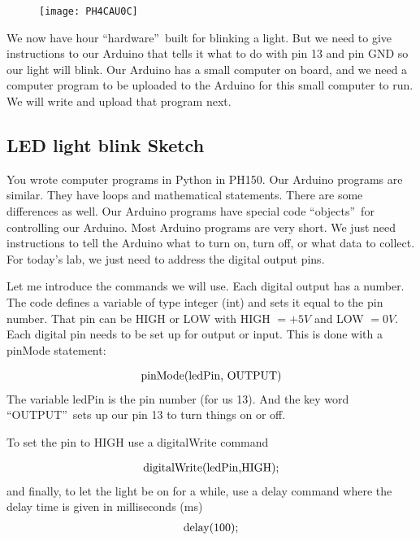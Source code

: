 \begin{figure}[h!]
\texttt{[image: PH4CAU0C]}
\end{figure}

We now have hour \textquotedblleft hardware\textquotedblright\ built for
blinking a light. But we need to give instructions to our Arduino that tells
it what to do with pin 13 and pin GND so our light will blink. Our Arduino
has a small computer on board, and we need a computer program to be uploaded
to the Arduino for this small computer to run. We will write and upload that
program next.

\subsection{LED light blink Sketch}

You wrote computer programs in Python in PH150. Our Arduino programs are
similar. They have loops and mathematical statements. There are some
differences as well. Our Arduino programs have special code
\textquotedblleft objects\textquotedblright\ for controlling our Arduino.
Most Arduino programs are very short. We just need instructions to tell the
Arduino what to turn on, turn off, or what data to collect. For today's lab,
we just need to address the digital output pins.

Let me introduce the commands we will use. Each digital output has a number.
The code defines a variable of type integer (int) and sets it equal to the
pin number. That pin can be HIGH or LOW with HIGH $=+5\unit{V}$ and LOW $=0%
\unit{V}$. Each digital pin needs to be set up for output or input. This is
done with a pinMode statement:

\begin{equation*}
\begin{tabular}{l}
pinMode(ledPin, OUTPUT)%
\end{tabular}%
\end{equation*}%
The variable ledPin is the pin number (for us 13). And the key word
\textquotedblleft OUTPUT\textquotedblright\ sets up our pin 13 to turn
things on or off.

To set the pin to HIGH use a digitalWrite command

\begin{equation*}
\begin{tabular}{l}
digitalWrite(ledPin,HIGH);%
\end{tabular}%
\end{equation*}%
and finally, to let the light be on for a while, use a delay command where
the delay time is given in milliseconds (ms)%
\begin{equation*}
\begin{tabular}{l}
delay(100);%
\end{tabular}%
\end{equation*}

